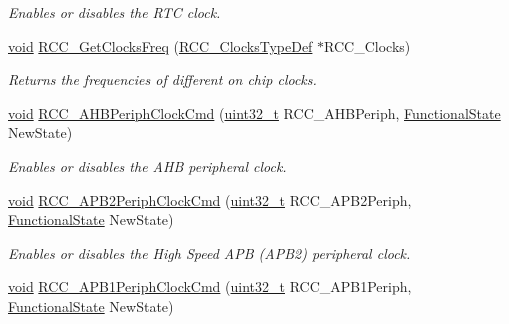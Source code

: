 \begin{DoxyCompactItemize}
\begin{DoxyCompactList}\small\item\em Enables or disables the R\+TC clock. \end{DoxyCompactList}\item 
\hyperlink{usb__devapi_8h_afabf60e7f57651d6d595a02c75f07cd0}{void} \hyperlink{group___r_c_c___private___functions_ga3e9944fd1ed734275222bbb3e3f29993}{R\+C\+C\+\_\+\+Get\+Clocks\+Freq} (\hyperlink{struct_r_c_c___clocks_type_def}{R\+C\+C\+\_\+\+Clocks\+Type\+Def} $\ast$R\+C\+C\+\_\+\+Clocks)
\begin{DoxyCompactList}\small\item\em Returns the frequencies of different on chip clocks. \end{DoxyCompactList}\item 
\hyperlink{usb__devapi_8h_afabf60e7f57651d6d595a02c75f07cd0}{void} \hyperlink{group___r_c_c___private___functions_gae0b30d8598b8393bdba9c3fefba3a968}{R\+C\+C\+\_\+\+A\+H\+B\+Periph\+Clock\+Cmd} (\hyperlink{_p_e___types_8h_a33594304e786b158f3fb30289278f5af}{uint32\+\_\+t} R\+C\+C\+\_\+\+A\+H\+B\+Periph, \hyperlink{agilefox_2library_2inc_2stm32f10x__type_8h_ac9a7e9a35d2513ec15c3b537aaa4fba1}{Functional\+State} New\+State)
\begin{DoxyCompactList}\small\item\em Enables or disables the A\+HB peripheral clock. \end{DoxyCompactList}\item 
\hyperlink{usb__devapi_8h_afabf60e7f57651d6d595a02c75f07cd0}{void} \hyperlink{group___r_c_c___private___functions_ga56ff55caf8d835351916b40dd030bc87}{R\+C\+C\+\_\+\+A\+P\+B2\+Periph\+Clock\+Cmd} (\hyperlink{_p_e___types_8h_a33594304e786b158f3fb30289278f5af}{uint32\+\_\+t} R\+C\+C\+\_\+\+A\+P\+B2\+Periph, \hyperlink{agilefox_2library_2inc_2stm32f10x__type_8h_ac9a7e9a35d2513ec15c3b537aaa4fba1}{Functional\+State} New\+State)
\begin{DoxyCompactList}\small\item\em Enables or disables the High Speed A\+PB (A\+P\+B2) peripheral clock. \end{DoxyCompactList}\item 
\hyperlink{usb__devapi_8h_afabf60e7f57651d6d595a02c75f07cd0}{void} \hyperlink{group___r_c_c___private___functions_gaee7cc5d73af7fe1986fceff8afd3973e}{R\+C\+C\+\_\+\+A\+P\+B1\+Periph\+Clock\+Cmd} (\hyperlink{_p_e___types_8h_a33594304e786b158f3fb30289278f5af}{uint32\+\_\+t} R\+C\+C\+\_\+\+A\+P\+B1\+Periph, \hyperlink{agilefox_2library_2inc_2stm32f10x__type_8h_ac9a7e9a35d2513ec15c3b537aaa4fba1}{Functional\+State} New\+State)

\end{DoxyCompactItemize}
